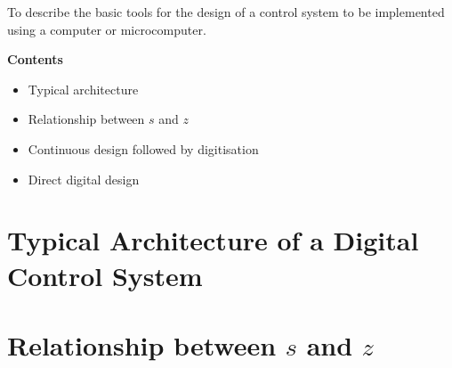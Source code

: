 \def\FileDate{10/01/21}
\def\FileVersion{1.0}

\begin{slide}
	To describe the basic tools for the design of a control system to be implemented using a computer or microcomputer.

	\textbf{Contents}
	\begin{itemize}
		\item Typical architecture
		\item Relationship between $s$ and $z$
		\item Continuous design followed by digitisation
		\item Direct digital design
	\end{itemize}
\end{slide}

\section*{Typical Architecture of a Digital Control System}

\begin{slide}
	\begin{center}
\end{center}
\end{slide}

\section*{Relationship between $s$ and $z$}

